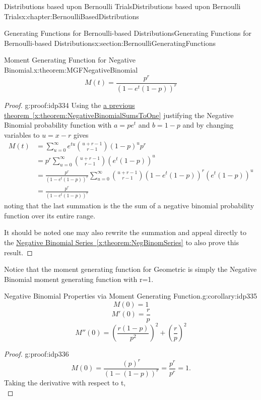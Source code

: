 \documentclass[oneside,10pt,]{book}
\newcommand{\xreffont}{\relax}
\numberwithin{equation}{section}
\begin{document}
\begin{chapterptx}{Distributions based upon Bernoulli Trials}{}{Distributions based upon Bernoulli Trials}{}{}{x:chapter:BernoulliBasedDistributions}
\begin{sectionptx}{Generating Functions for Bernoulli-based Distributions}{}{Generating Functions for Bernoulli-based Distributions}{}{}{x:section:BernoulliGeneratingFunctions}
\begin{theorem}{Moment Generating Function for Negative Binomial.}{}{x:theorem:MGFNegativeBinomial}
%
\begin{equation*}
M(t)  = \frac{p^r}{(1 - e^t(1-p))^r}
\end{equation*}
%
\end{theorem}
\begin{proof}{}{g:proof:idp334}
Using the \hyperref[x:theorem:NegativeBinomialSumsToOne]{a previous theorem~{\xreffont\ref{x:theorem:NegativeBinomialSumsToOne}}} justifying the Negative Binomial probability function  with \(a = p e^t\) and \(b = 1-p\) and by changing variables to \(u = x-r\) gives%
\begin{align*}
M(t) & = \sum_{u=0}^{\infty} e^{tu} \binom{u+r - 1}{r-1}(1-p)^{u}p^r\\
& =  p^r \sum_{u=0}^{\infty} \binom{u + r - 1}{r-1}(e^t(1-p))^u \\
& = \frac{ p^{r}}{(1 - e^t(1-p))^r} \sum_{u=0}^{\infty} \binom{u + r - 1}{r-1}(1 - e^t(1-p))^r (e^t(1-p))^u \\
& = \frac{p^{r}}{(1 - e^t(1-p))^r}  
\end{align*}
noting that the last summation is the the sum of a negative binomial probability function over its entire range.%
\par
It should be noted one may also rewrite the summation and appeal directly to the \hyperref[x:theorem:NegBinomSeries]{Negative Binomial Series~{\xreffont\ref{x:theorem:NegBinomSeries}}} to also prove this result.%
\end{proof}
Notice that the moment generating function for Geometric is simply the Negative Binomial moment generating function with r=1.%
\begin{corollary}{Negative Binomial Properties via Moment Generating Function.}{}{g:corollary:idp335}%
%
\begin{equation*}
M(0) = 1
\end{equation*}
%
\begin{equation*}
M'(0) = \frac{r}{p}
\end{equation*}
%
\begin{equation*}
M''(0) = \left ( \frac{r(1-p)}{p^2} \right )^2 + \left ( \frac{r}{p} \right )^2
\end{equation*}
%
\end{corollary}
\begin{proof}{}{g:proof:idp336}
%
\begin{equation*}
M(0) = \frac{(p)^r}{(1 - (1-p))^r} = \frac{p^r}{p^r} = 1.
\end{equation*}
Taking the derivative with respect to t,%
\begin{equation*}

\end{equation*}
\end{proof}
\end{sectionptx}
\end{chapterptx}
\end{document}
